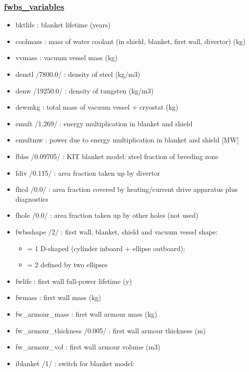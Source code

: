 \documentclass[
]{article}
\providecommand{\tightlist}{%
  \setlength{\itemsep}{0pt}\setlength{\parskip}{0pt}}
\begin{document}
\begin{itemize}
  \hypertarget{fwbs_variables}{%
  \subsubsection{\texorpdfstring{\href{fwbs_variables.html}{fwbs\_variables}}{fwbs\_variables}}\label{fwbs_variables}}

  \begin{itemize}
  \item
    bktlife : blanket lifetime (years)
  \item
    coolmass : mass of water coolant (in shield, blanket, first wall,
    divertor) (kg)
  \item
    vvmass : vacuum vessel mass (kg)
  \item
    denstl /7800.0/ : density of steel (kg/m3)
  \item
    denw /19250.0/ : density of tungsten (kg/m3)
  \item
    dewmkg : total mass of vacuum vessel + cryostat (kg)
  \item
    emult /1.269/ : energy multiplication in blanket and shield
  \item
    emultmw : power due to energy multiplication in blanket and shield
    {[}MW{]}
  \item
    fblss /0.09705/ : KIT blanket model: steel fraction of breeding zone
  \item
    fdiv /0.115/ : area fraction taken up by divertor
  \item
    fhcd /0.0/ : area fraction covered by heating/current drive
    apparatus plus diagnostics
  \item
    fhole /0.0/ : area fraction taken up by other holes (not used)
  \item
    fwbsshape /2/ : first wall, blanket, shield and vacuum vessel shape:

    \begin{itemize}
    \tightlist
    \item
      = 1 D-shaped (cylinder inboard + ellipse outboard);
    \item
      = 2 defined by two ellipses
    \end{itemize}
  \item
    fwlife : first wall full-power lifetime (y)
  \item
    fwmass : first wall mass (kg)
  \item
    fw\_armour\_mass : first wall armour mass (kg)
  \item
    fw\_armour\_thickness /0.005/ : first wall armour thickness (m)
  \item
    fw\_armour\_vol : first wall armour volume (m3)
  \item
    iblanket /1/ : switch for blanket model:


\end{itemize}
\end{itemize}
\end{document}
